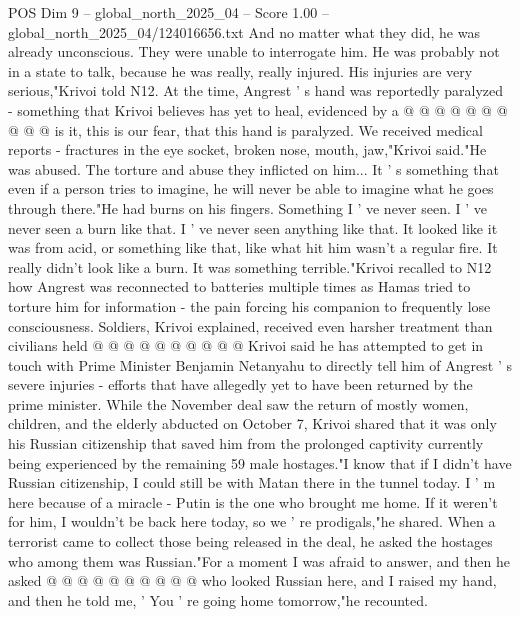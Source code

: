 \begin{textsample}{POS Dim 9 – global\_north\_2025\_04 – Score 1.00 – global\_north\_2025\_04/124016656.txt}
And no matter what they did, he was already unconscious.
They were unable to interrogate him.
He was probably not in a state to talk, because he was really, really injured.
His injuries are very serious,"Krivoi told N12.
At the time, Angrest ' s hand was reportedly paralyzed - something that Krivoi believes has yet to heal, evidenced by a @ @ @ @ @ @ @ @ @ @ is it, this is our fear, that this hand is paralyzed.
We received medical reports - fractures in the eye socket, broken nose, mouth, jaw,"Krivoi said."He was abused.
The torture and abuse they inflicted on him...
It ' s something that even if a person tries to imagine, he will never be able to imagine what he goes through there."He had burns on his fingers.
Something I ' ve never seen.
I ' ve never seen a burn like that.
I ' ve never seen anything like that.
It looked like it was from acid, or something like that, like what hit him wasn't a regular fire.
It really didn't look like a burn.
It was something terrible."Krivoi recalled to N12 how Angrest was reconnected to batteries multiple times as Hamas tried to torture him for information - the pain forcing his companion to frequently lose consciousness.
Soldiers, Krivoi explained, received even harsher treatment than civilians held @ @ @ @ @ @ @ @ @ @ Krivoi said he has attempted to get in touch with Prime Minister Benjamin Netanyahu to directly tell him of Angrest ' s severe injuries - efforts that have allegedly yet to have been returned by the prime minister.
While the November deal saw the return of mostly women, children, and the elderly abducted on October 7, Krivoi shared that it was only his Russian citizenship that saved him from the prolonged captivity currently being experienced by the remaining 59 male hostages."I know that if I didn't have Russian citizenship, I could still be with Matan there in the tunnel today.
I ' m here because of a miracle - Putin is the one who brought me home.
If it weren't for him, I wouldn't be back here today, so we ' re prodigals,"he shared.
When a terrorist came to collect those being released in the deal, he asked the hostages who among them was Russian."For a moment I was afraid to answer, and then he asked @ @ @ @ @ @ @ @ @ @ who looked Russian here, and I raised my hand, and then he told me, ' You ' re going home tomorrow,"he recounted.

\end{textsample}
